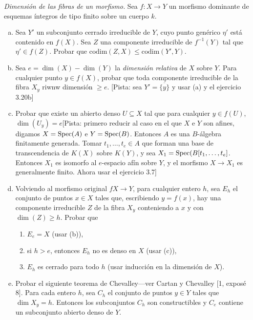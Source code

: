 \documentclass[twoside]{article}
\begin{document}
\newpage

\begin{ejercicio}{3.22}\emph{Dimensión de las fibras de un morfismo.} Sea $f:X\to Y$ un morfismo dominante de esquemas íntegros de tipo finito sobre un cuerpo $k$. 
\begin{enumerate}[(a)]
\item Sea $Y'$ un subconjunto cerrado irreducible de $Y$, cuyo punto genérico $\eta'$ está contenido en $f(X)$. Sea $Z$ una componente irreducible de $f^{-1}(Y)$ tal que $\eta'\in f(Z)$. Probar que $\mathrm{codim}(Z,X)\leq \mathrm{codim}(Y',Y)$. 
\item Sea $e=\dim(X)-\dim(Y)$ la \emph{dimensión relativa} de $X$ sobre $Y$. Para cualquier punto $y\in f(X)$, probar que toda componente irreducible de la fibra $X_y$ riwnw dimensión $\geq e$. [Pista: sea $Y'=\overline{\{y\}}$ y usar (a) y el ejercicio 3.20b]
\item Probar que existe un abierto denso $U\subseteq X$ tal que para cualquier $y\in f(U)$, $\dim(U_y)=e$[Pista: primero reducir al caso en el que $X$ e $Y$ son afines, digamos $X=\operatorname{Spec}(A)$ e $Y=\operatorname{Spec}(B)$. Entonces $A$ es una $B$-álgebra finitamente generada. Tomar $t_1,\dots, t_e\in A$ que forman una base de transcendencia de $K(X)$ sobre $K(Y)$, y sea $X_1=\operatorname{Spec}(B[t_1,\dots, t_e]$. Entonces $X_1$ es isomorfo al $e$-espacio afín sobre $Y$, y el morfismo $X\to X_1$ es generalmente finito. Ahora usar el ejercicio 3.7]
\item Volviendo al morfismo original $fX\to Y$, para cualquier entero $h$, sea $E_h$ el conjunto de puntos $x\in X$ tales que, escribiendo $y=f(x)$, hay una componente irreducible $Z$ de la fibra $X_y$ conteniendo a $x$ y con $\dim(Z)\geq h$. Probar que
\begin{enumerate}
\item $E_e=X$ (usar (b)),
\item si $h>e$, entonces $E_h$ no es denso en $X$ (usar (c)),
\item $E_h$ es cerrado para todo $h$ (usar inducción en la dimensión de $X$).
\end{enumerate}
\item Probar el siguiente teorema de Chevalley---ver Cartan y Chevalley [1, exposé 8]. Para cada entero $h$, sea $C_h$ el conjunto de puntos $y\in Y$ tales que $\dim X_y=h$. Entonces los subconjuntos $C_h$ son constructibles y $C_e$ contiene un subconjunto abierto denso de $Y$.
\end{enumerate}

\end{ejercicio}
\end{document}
